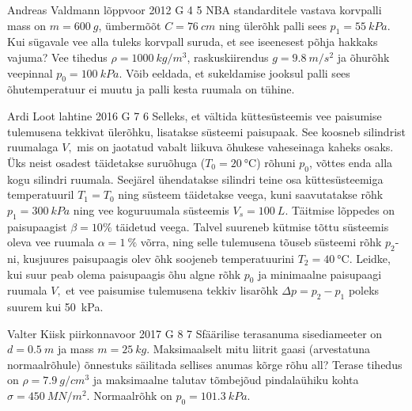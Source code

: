 \documentclass[11pt]{article}
\begin{document}
{%
{Andreas Valdmann} %
{lõppvoor} %
{2012} %
{G 4} %
{5} %
{
\ifStatement
NBA standarditele vastava korvpalli mass on $m=\SI{600}{g}$, ümbermõõt
$C=\SI{76}{cm}$ ning ülerõhk palli sees $p_1=\SI{55}{kPa}$. Kui sügavale vee
alla tuleks korvpall suruda, et see iseenesest põhja hakkaks vajuma? Vee tihedus
$\rho=\SI{1000}{kg/m^3}$, raskuskiirendus $g=\SI{9,8}{m/s^2}$ ja õhurõhk
veepinnal $p_0=\SI{100}{kPa}$. Võib eeldada, et sukeldamise jooksul palli sees
õhutemperatuur ei muutu ja palli kesta ruumala on tühine.
\fi
}

{Ardi Loot} %
{lahtine} %
{2016} %
{G 7} %
{6} %
{
\ifStatement
Selleks, et vältida küttesüsteemis vee paisumise tulemusena tekkivat
ülerõhku, lisatakse süsteemi paisupaak. See koosneb silindrist ruumalaga
$V,$ mis on jaotatud vabalt liikuva õhukese vaheseinaga kaheks osaks. Üks
neist osadest täidetakse suruõhuga ($T_{0}=\SI{20}{\celsius}$)
rõhuni $p_{0}$, võttes enda alla kogu silindri ruumala. Seejärel ühendatakse silindri teine osa küttesüsteemiga temperatuuril $T_{1}=T_{0}$ ning süsteem täidetakse
veega, kuni saavutatakse rõhk $p_{1}=\SI{300}{kPa}$ ning vee koguruumala süsteemis $V_{s}=\SI{100}{L}$.
Täitmise lõppedes on paisupaagist $\beta=10\%$ täidetud veega. Talvel suureneb kütmise tõttu süsteemis oleva vee ruumala $\alpha=\SI{1}{\%}$ võrra, ning selle tulemusena tõuseb süsteemi rõhk $p_{2}$-ni, kusjuures paisupaagis olev õhk soojeneb temperatuurini $T_{2}=\SI{40}{\celsius}$. Leidke, kui suur peab olema paisupaagis
õhu algne rõhk $p_{0}$ ja minimaalne paisupaagi ruumala $V,$
et vee paisumise tulemusena tekkiv lisarõhk $\Delta p=p_{2}-p_{1}$
poleks suurem kui \SI{50}{kPa}. 
\fi
}

{Valter Kiisk} %
{piirkonnavoor} %
{2017} %
{G 8} %
{7} %
{
\ifStatement
Sfäärilise terasanuma sisediameeter on $d=\SI{0.5}{m}$ ja mass $m=\SI{25}{kg}$. Maksimaalselt mitu liitrit gaasi (arvestatuna normaalrõhule) õnnestuks säilitada sellises anumas kõrge rõhu all? Terase tihedus on $\rho=\SI{7.9}{g/cm^3}$ ja maksimaalne talutav tõmbejõud pindalaühiku kohta $\sigma=\SI{450}{MN/m^2}$. Normaalrõhk on $p_0=\SI{101.3}{kPa}$.
\fi
}

}
\end{document}
